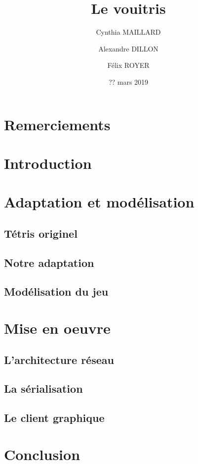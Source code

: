 \documentclass[a4paper, 12pt]{article}
\title{Le vouitris}
\date{?? mars 2019}
\author{Cynthia MAILLARD \and Alexandre DILLON \and Félix ROYER}
\begin{document}
\maketitle

\section*{Remerciements}

\section*{Introduction}

\section{Adaptation et modélisation}
	\subsection{Tétris originel}

	\subsection{Notre adaptation}

	\subsection{Modélisation du jeu}

\section{Mise en oeuvre}
	\subsection{L'architecture réseau}

	\subsection{La sérialisation}

	\subsection{Le client graphique}

\section*{Conclusion}
\end{document}
